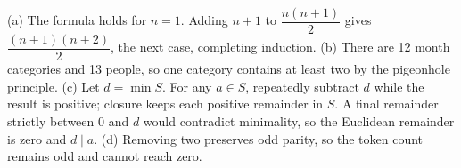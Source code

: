 (a) The formula holds for $n=1$. Adding $n+1$ to $\dfrac{n(n+1)}{2}$ gives $\dfrac{(n+1)(n+2)}{2}$, the next case, completing induction. (b) There are 12 month categories and 13 people, so one category contains at least two by the pigeonhole principle. (c) Let $d=\min S$. For any $a\in S$, repeatedly subtract $d$ while the result is positive; closure keeps each positive remainder in $S$. A final remainder strictly between 0 and $d$ would contradict minimality, so the Euclidean remainder is zero and $d\mid a$. (d) Removing two preserves odd parity, so the token count remains odd and cannot reach zero.
